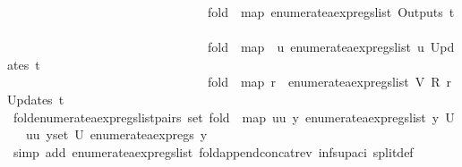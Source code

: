 \begin{isabellebody}
\ \ \ \ \ \ \ \ \ \ \ \ \ \ \ \ \ \ \ \ \ \ \ \ \ \ \ \ \ \ \ \ {\isacharparenleft}fold\ {\isacharparenleft}{\isacharat}{\isacharparenright}\ {\isacharparenleft}map\ enumerate{\isacharunderscore}aexp{\isacharunderscore}regs{\isacharunderscore}list\ {\isacharparenleft}Outputs\ t{\isacharparenright}{\isacharparenright}\ {\isacharbrackleft}{\isacharbrackright}{\isacharparenright}\ {\isacharat}\isanewline
\ \ \ \ \ \ \ \ \ \ \ \ \ \ \ \ \ \ \ \ \ \ \ \ \ \ \ \ \ \ \ \ {\isacharparenleft}fold\ {\isacharparenleft}{\isacharat}{\isacharparenright}\ {\isacharparenleft}map\ {\isacharparenleft}{\isasymlambda}{\isacharparenleft}{\isacharunderscore}{\isacharcomma}\ u{\isacharparenright}{\isachardot}\ enumerate{\isacharunderscore}aexp{\isacharunderscore}regs{\isacharunderscore}list\ u{\isacharparenright}\ {\isacharparenleft}Updates\ t{\isacharparenright}{\isacharparenright}\ {\isacharbrackleft}{\isacharbrackright}{\isacharparenright}\ {\isacharat}\isanewline
\ \ \ \ \ \ \ \ \ \ \ \ \ \ \ \ \ \ \ \ \ \ \ \ \ \ \ \ \ \ \ \ {\isacharparenleft}fold\ {\isacharparenleft}{\isacharat}{\isacharparenright}\ {\isacharparenleft}map\ {\isacharparenleft}{\isasymlambda}{\isacharparenleft}r{\isacharcomma}\ {\isacharunderscore}{\isacharparenright}{\isachardot}\ enumerate{\isacharunderscore}aexp{\isacharunderscore}regs{\isacharunderscore}list\ {\isacharparenleft}V\ {\isacharparenleft}R\ r{\isacharparenright}{\isacharparenright}{\isacharparenright}\ {\isacharparenleft}Updates\ t{\isacharparenright}{\isacharparenright}\ {\isacharbrackleft}{\isacharbrackright}{\isacharparenright}{\isachardoublequoteclose}\isanewline
\isanewline
{}\isamarkupfalse%
\ fold{\isacharunderscore}enumerate{\isacharunderscore}aexp{\isacharunderscore}regs{\isacharunderscore}list{\isacharunderscore}pairs{\isacharcolon}\ {\isachardoublequoteopen}set\ {\isacharparenleft}fold\ {\isacharparenleft}{\isacharat}{\isacharparenright}\ {\isacharparenleft}map\ {\isacharparenleft}{\isasymlambda}{\isacharparenleft}uu{\isacharcomma}\ y{\isacharparenright}{\isachardot}\ enumerate{\isacharunderscore}aexp{\isacharunderscore}regs{\isacharunderscore}list\ y{\isacharparenright}\ U{\isacharparenright}\ {\isacharbrackleft}{\isacharbrackright}{\isacharparenright}\ {\isacharequal}\ {\isacharparenleft}{\isasymUnion}{\isacharparenleft}uu{\isacharcomma}\ y{\isacharparenright}{\isasymin}set\ U{\isachardot}\ enumerate{\isacharunderscore}aexp{\isacharunderscore}regs\ y{\isacharparenright}{\isachardoublequoteclose}\isanewline
%
\isadelimproof
\ \ %
\endisadelimproof
%
\isatagproof
{}\isamarkupfalse%
\ {\isacharparenleft}simp\ add{\isacharcolon}\ enumerate{\isacharunderscore}aexp{\isacharunderscore}regs{\isacharunderscore}list\ fold{\isacharunderscore}append{\isacharunderscore}concat{\isacharunderscore}rev\ inf{\isacharunderscore}sup{\isacharunderscore}aci{\isacharparenleft}{}{\isacharparenright}\ split{\isacharunderscore}def{\isacharparenright}%

\end{isabellebody}
